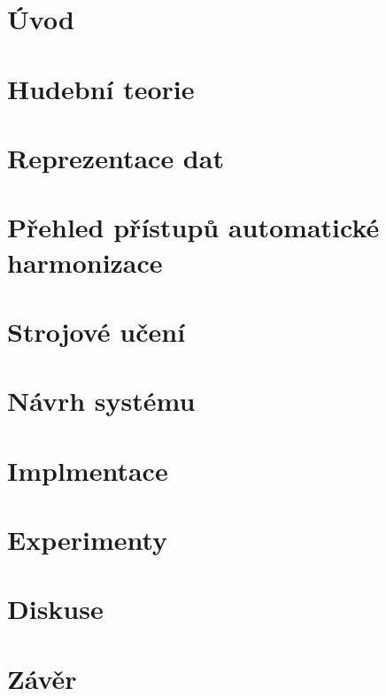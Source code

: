 \chapter{Úvod}
\label{uvod}


\chapter{Hudební teorie}

\chapter{Reprezentace dat}


\chapter{Přehled přístupů automatické harmonizace}


\chapter{Strojové učení}

\chapter{Návrh systému}

\chapter{Implmentace}

\chapter{Experimenty}

\chapter{Diskuse}

\chapter{Závěr}
\label{zaver}
